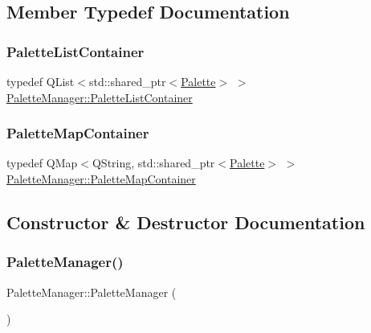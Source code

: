 \subsection{Member Typedef Documentation}
\mbox{\label{class_palette_manager_ab2eef0ecf4e5473d79a6943ddaefe60f}} 
\subsubsection{\texorpdfstring{PaletteListContainer}{PaletteListContainer}}
{\footnotesize\ttfamily typedef Q\+List$<$std\+::shared\+\_\+ptr$<$\mbox{\hyperlink{class_palette}{Palette}}$>$ $>$ \mbox{\hyperlink{class_palette_manager_ab2eef0ecf4e5473d79a6943ddaefe60f}{Palette\+Manager\+::\+Palette\+List\+Container}}\hspace{0.3cm}{\ttfamily [protected]}}

\mbox{\label{class_palette_manager_aa850f90513b7da9d828034105a1390e6}} 
\subsubsection{\texorpdfstring{PaletteMapContainer}{PaletteMapContainer}}
{\footnotesize\ttfamily typedef Q\+Map$<$Q\+String, std\+::shared\+\_\+ptr$<$\mbox{\hyperlink{class_palette}{Palette}}$>$ $>$ \mbox{\hyperlink{class_palette_manager_aa850f90513b7da9d828034105a1390e6}{Palette\+Manager\+::\+Palette\+Map\+Container}}\hspace{0.3cm}{\ttfamily [protected]}}



\subsection{Constructor \& Destructor Documentation}
\mbox{\label{class_palette_manager_a32e23cb5e0fe38b37a18732412d58526}} 
\subsubsection{\texorpdfstring{PaletteManager()}{PaletteManager()}}
{\footnotesize\ttfamily Palette\+Manager\+::\+Palette\+Manager (\begin{DoxyParamCaption}{ }\end{DoxyParamCaption})}

